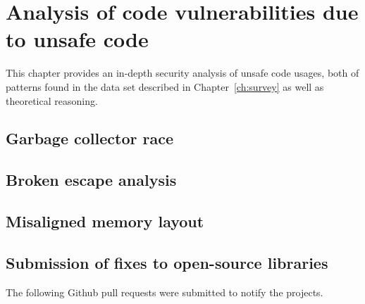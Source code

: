 
\chapter{Analysis of code vulnerabilities due to unsafe code}\label{ch:code-vulnerabilities}

This chapter provides an in-depth security analysis of unsafe code usages, both of patterns found in the data set
described in Chapter~\ref{ch:survey} as well as theoretical reasoning.



\section{Garbage collector race}\label{sec:vulnerability-gc-race}



\section{Broken escape analysis}\label{sec:vulnerability-escape-analysis}



\section{Misaligned memory layout}\label{sec:vulnerability-alignment}



\section{Submission of fixes to open-source libraries}\label{sec:vulnerability-fixes}

The following Github pull requests were submitted to notify the projects.

